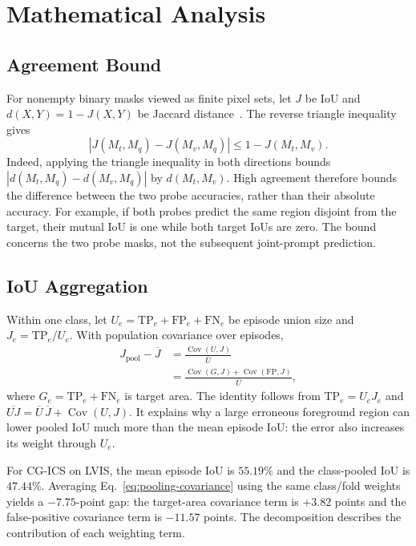 \section{Mathematical Analysis}
\label{app:math}
\subsection{Agreement Bound}
For nonempty binary masks viewed as finite pixel sets, let $J$ be IoU and
$d(X,Y)=1-J(X,Y)$ be Jaccard distance~\cite{kosub2019}.
The reverse triangle inequality gives
\begin{equation}
  \left|J(M_t,M_q)-J(M_v,M_q)\right|
  \leq 1-J(M_t,M_v).
  \label{eq:agreement-bound}
\end{equation}
Indeed, applying the triangle inequality in both directions bounds
$|d(M_t,M_q)-d(M_v,M_q)|$ by $d(M_t,M_v)$.
High agreement therefore bounds the difference between the two probe
accuracies, rather than their absolute accuracy. For example, if both
probes predict the same region disjoint from the target, their mutual
IoU is one while both target IoUs are zero. The bound concerns the two
probe masks, not the subsequent joint-prompt prediction.

\subsection{IoU Aggregation}
\balance
Within one class, let $U_e=\mathrm{TP}_e+\mathrm{FP}_e+\mathrm{FN}_e$
be episode union size and $J_e=\mathrm{TP}_e/U_e$. With population
covariance over episodes,
\begin{equation}
  \begin{aligned}
  J_{\mathrm{pool}}-\overline{J}
  &=\frac{\operatorname{Cov}(U,J)}{\overline{U}}\\
  &=\frac{\operatorname{Cov}(G,J)+\operatorname{Cov}(\mathrm{FP},J)}
         {\overline{U}},
  \end{aligned}
  \label{eq:pooling-covariance}
\end{equation}
where $G_e=\mathrm{TP}_e+\mathrm{FN}_e$ is target area.
The identity follows from $\mathrm{TP}_e=U_eJ_e$ and
$\overline{UJ}=\overline{U}\,\overline{J}+\operatorname{Cov}(U,J)$.
It explains why a large erroneous foreground region can lower pooled
IoU much more than the mean episode IoU: the error also increases its
weight through $U_e$.

For CG-ICS on LVIS, the mean episode IoU is $55.19\%$ and the class-pooled
IoU is $47.44\%$. Averaging Eq.~\ref{eq:pooling-covariance} using the
same class/fold weights yields a $-7.75$-point gap: the target-area
covariance term is $+3.82$ points and the false-positive covariance
term is $-11.57$ points. The decomposition describes the contribution of each weighting term.


